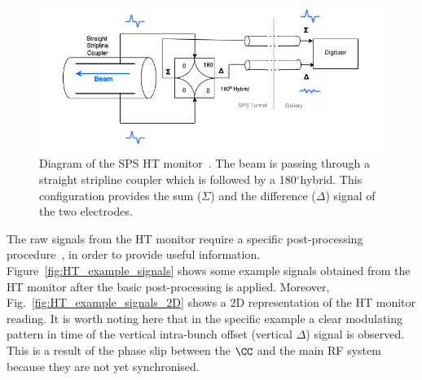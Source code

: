 \begin{figure}[h]%
   \centering         
   \includegraphics[width=1.0\textwidth]{images/Ch4/HT_monitor_sketch.png}
       \caption{Diagram of the SPS HT monitor~\cite{Levens:2313358}. The beam is passing through a straight stripline coupler which is followed by a 180$^\circ$hybrid. This configuration provides the sum ($\Sigma$) and the difference ($\Delta$) signal of the two electrodes.} %
       \label{fig:SPS_HT_diagram}
\end{figure}

The raw signals from the HT monitor require a specific post-processing procedure~\cite{Levens:2313358}, in order to provide useful information. Figure~\ref{fig:HT_example_signals} shows some example signals obtained from the HT monitor after the basic post-processing is applied. Moreover, Fig.~\ref{fig:HT_example_signals_2D} shows a 2D representation of the HT monitor reading. It is worth noting here that in the specific example a clear modulating pattern in time of the vertical intra-bunch offset (vertical $\Delta$) signal is observed. This is a result of the phase slip between the $\CC$ and the main RF system because they are not yet synchronised. 


